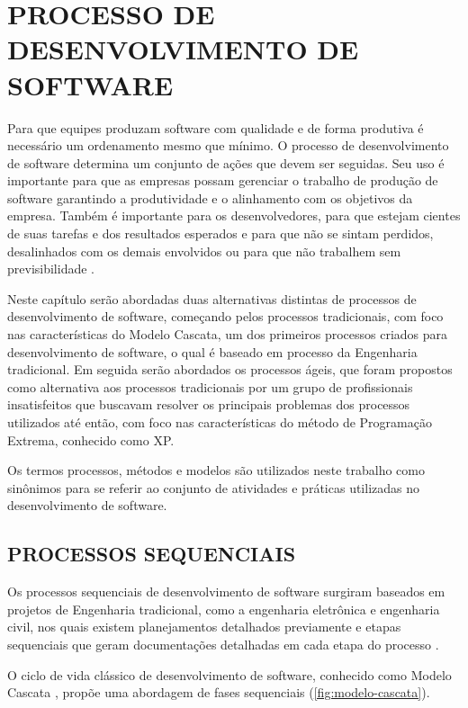 \chapter{PROCESSO DE DESENVOLVIMENTO DE SOFTWARE}
\label{chap:processos-de-software}

Para que equipes produzam software com qualidade e de forma produtiva é necessário um ordenamento mesmo que mínimo. O processo de desenvolvimento de software determina um conjunto de ações que devem ser seguidas. Seu uso é importante para que as empresas possam gerenciar o trabalho de produção de software garantindo a produtividade e o alinhamento com os objetivos da empresa. Também é importante para os desenvolvedores, para que estejam cientes de suas tarefas e dos resultados esperados e para que não se sintam perdidos, desalinhados com os demais envolvidos ou para que não trabalhem sem previsibilidade \cite{Valente2020}.

Neste capítulo serão abordadas duas alternativas distintas de processos de desenvolvimento de software, começando pelos processos tradicionais, com foco nas características do Modelo Cascata, um dos primeiros processos criados para desenvolvimento de software, o qual é baseado em processo da Engenharia tradicional. Em seguida serão abordados os processos ágeis, que foram propostos como alternativa aos processos tradicionais por um grupo de profissionais insatisfeitos que buscavam resolver os principais problemas dos processos utilizados até então, com foco nas características do método de Programação Extrema, conhecido como XP.

Os termos processos, métodos e modelos são utilizados neste trabalho como sinônimos para se referir ao conjunto de atividades e práticas utilizadas no desenvolvimento de software.

    \section{PROCESSOS SEQUENCIAIS}
    Os processos sequenciais de desenvolvimento de software surgiram baseados em projetos de Engenharia tradicional, como a engenharia eletrônica e engenharia civil, nos quais existem planejamentos detalhados previamente e etapas sequenciais que geram documentações detalhadas em cada etapa do processo \cite{Valente2020}.
    
    O ciclo de vida clássico de desenvolvimento de software, conhecido como Modelo Cascata \cite{Pressman2015}, propõe uma abordagem de fases sequenciais (\autoref{fig:modelo-cascata}). 
    
